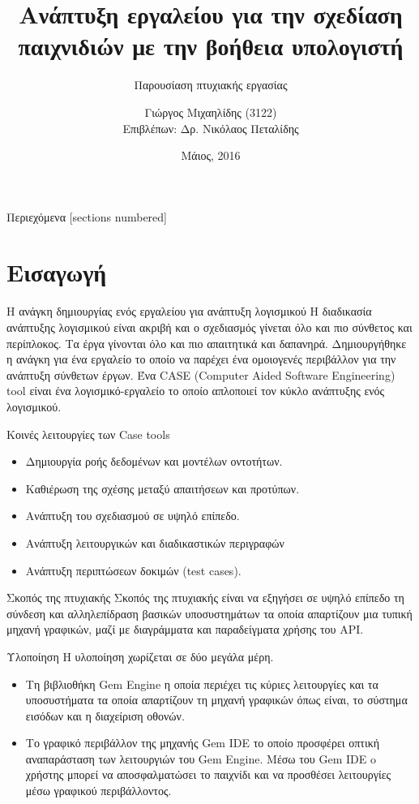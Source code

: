 \documentclass{beamer}
\title{Ανάπτυξη εργαλείου για την σχεδίαση παιχνιδιών με την βοήθεια υπολογιστή}
\subtitle{Παρουσίαση πτυχιακής εργασίας}
\date{Μάιος, 2016}
\author[Your Name]{Γιώργος Μιχαηλίδης (3122)
	\\{\small Επιβλέπων: Δρ. Νικόλαος Πεταλίδης}}
\institute{ΤΕΧΝΟΛΟΓΙΚΟ ΕΚΠΑΙΔΕΥΤΙΚΟ ΙΔΡΥΜΑ ΚΕΝΤΡΙΚΗΣ ΜΑΚΕΔΟΝΙΑΣ\\
	ΣΧΟΛΗ ΤΕΧΝΟΛΟΓΙΚΩΝ ΕΦΑΡΜΟΓΩΝ\\
	ΤΜΗΜΑ ΜΗΧΑΝΙΚΩΝ ΠΛΗΡΟΦΟΡΙΚΗΣ ΤΕ}
\begin{document}
	\maketitle
	\begin{frame}{Περιεχόμενα}
		[sections numbered]
		\tableofcontents%
	\end{frame}
	
	\section{Εισαγωγή}
		\begin{frame}{Η ανάγκη δημιουργίας ενός εργαλείου για ανάπτυξη λογισμικού}
			Η διαδικασία ανάπτυξης λογισμικού είναι ακριβή και ο σχεδιασμός γίνεται όλο και πιο σύνθετος και περίπλοκος. Τα έργα γίνονται όλο και πιο απαιτητικά και δαπανηρά. Δημιουργήθηκε η ανάγκη για ένα εργαλείο το οποίο να παρέχει ένα ομοιογενές περιβάλλον για την ανάπτυξη σύνθετων έργων. 
			Ένα \alert{CASE (Computer Aided Software Engineering) tool} είναι ένα λογισμικό-εργαλείο το οποίο απλοποιεί τον κύκλο ανάπτυξης ενός λογισμικού. 		
		\end{frame}		
		\begin{frame}{Κοινές λειτουργίες των Case tools}
			\begin{itemize}
				\item Δημιουργία ροής δεδομένων και μοντέλων οντοτήτων.
				\item Καθιέρωση της σχέσης μεταξύ απαιτήσεων και προτύπων.
				\item Ανάπτυξη του σχεδιασμού σε υψηλό επίπεδο.
				\item Ανάπτυξη λειτουργικών και διαδικαστικών περιγραφών
				\item Ανάπτυξη περιπτώσεων δοκιμών (test cases).	
			\end{itemize}		
		\end{frame}	
		\begin{frame}{Σκοπός της πτυχιακής}
			Σκοπός της πτυχιακής είναι να εξηγήσει σε υψηλό επίπεδο τη σύνδεση και αλληλεπίδραση βασικών υποσυστημάτων τα οποία απαρτίζουν μια
			τυπική μηχανή γραφικών, μαζί με διαγράμματα και παραδείγματα χρήσης του API.
		\end{frame}	
		\begin{frame}{Υλοποίηση}
		Η υλοποίηση χωρίζεται σε δύο μεγάλα μέρη.	
		\begin{itemize}
			\item Τη βιβλιοθήκη \alert{Gem Engine} η οποία περιέχει τις κύριες λειτουργίες και τα υποσυστήματα τα οποία απαρτίζουν τη μηχανή γραφικών όπως είναι, το σύστημα εισόδων και η διαχείριση οθονών.
			\item Tο γραφικό περιβάλλον της μηχανής \alert{Gem IDE} το οποίο προσφέρει οπτική αναπαράσταση των λειτουργιών του \alert{Gem Engine}. Μέσω του \alert{Gem IDE} o χρήστης μπορεί να αποσφαλματώσει το παιχνίδι και να προσθέσει λειτουργίες μέσω γραφικού περιβάλλοντος.
		\end{itemize}
		\end{frame}			
		
\end{document}
